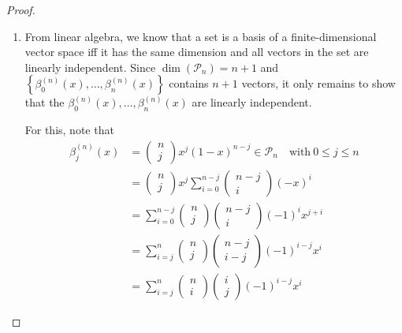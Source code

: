 \begin{proof}
	\begin{enumerate}[label=(\alph*)]
		\item From linear algebra, we know that a set is a basis of a finite-dimensional vector space iff it has the same dimension and all vectors in the set are linearly independent. Since $\dim(\mathcal P_n) = n + 1$ and $\left\{ \beta_{0}^{(n)}(x), \dots, \beta_{n}^{(n)}(x) \right\}$ contains $n + 1$ vectors, it only remains to show that the $\beta_{0}^{(n)}(x), \dots, \beta_{n}^{(n)}(x)$ are linearly independent.
		
		For this, note that \cite[proof Lemma 2.5 ix)]{thesis:bernstein_polynomials}
		\begin{align}
			\beta_j^{(n)}(x) &= \begin{pmatrix}
				n \\ j
			\end{pmatrix} x^j (1 - x)^{n-j} \in\mathcal P_n \quad \text{with}\ 0\leq j\leq n
			\\[4pt] &= \begin{pmatrix}
				n \\ j
			\end{pmatrix} x^j\sum_{i = 0}^{n - j}\begin{pmatrix}
				n - j\\ i
			\end{pmatrix} \left(-x\right)^{i}
			\\[4pt] &= \sum_{i=0}^{n - j}\begin{pmatrix}
				n \\ j
			\end{pmatrix}\begin{pmatrix} n - j\\ i \end{pmatrix} \left(-1\right)^i x^{j + i}
			\\[4pt] &= \sum_{i=j}^{n}\begin{pmatrix}
				n \\ j
			\end{pmatrix}\begin{pmatrix} n - j\\ i - j\end{pmatrix} \left(-1\right)^{i - j} x^{i}
			\\[4pt] \label{eq:bernstein_polynomial_rewriting} &= \sum_{i=j}^{n}\begin{pmatrix}
				n \\ i
			\end{pmatrix}\begin{pmatrix} i\\ j\end{pmatrix} \left(-1\right)^{i - j} x^{i}

\end{align}
\end{enumerate}
\end{proof}
